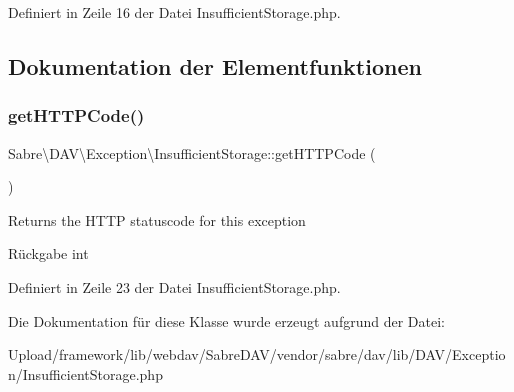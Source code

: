 Definiert in Zeile 16 der Datei Insufficient\+Storage.\+php.



\subsection{Dokumentation der Elementfunktionen}
\mbox{\label{class_sabre_1_1_d_a_v_1_1_exception_1_1_insufficient_storage_a98b241f1a1ba5d5fbda41e1284cd069d}} 
\subsubsection{\texorpdfstring{get\+H\+T\+T\+P\+Code()}{getHTTPCode()}}
{\footnotesize\ttfamily Sabre\textbackslash{}\+D\+A\+V\textbackslash{}\+Exception\textbackslash{}\+Insufficient\+Storage\+::get\+H\+T\+T\+P\+Code (\begin{DoxyParamCaption}{ }\end{DoxyParamCaption})}

Returns the H\+T\+TP statuscode for this exception

\begin{DoxyReturn}{Rückgabe}
int 
\end{DoxyReturn}


Definiert in Zeile 23 der Datei Insufficient\+Storage.\+php.



Die Dokumentation für diese Klasse wurde erzeugt aufgrund der Datei\+:\begin{DoxyCompactItemize}
\item 
Upload/framework/lib/webdav/\+Sabre\+D\+A\+V/vendor/sabre/dav/lib/\+D\+A\+V/\+Exception/Insufficient\+Storage.\+php\end{DoxyCompactItemize}
